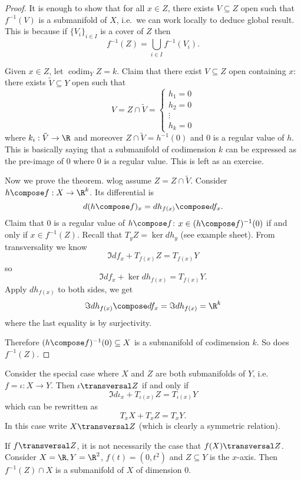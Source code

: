 \documentclass[a4paper]{article}
\DeclareMathOperator{\codim}{codim}
\begin{document}
\begin{proof}
  It is enough to show that for all \(x \in Z\), there exists \(V \subseteq Z\) open such that \(f^{-1}(V)\) is a submanifold of \(X\), i.e.\ we can work locally to deduce global result. This is because if \(\{V_i\}_{i \in I}\) is a cover of \(Z\) then
  \[
    f^{-1}(Z) = \bigcup_{i \in I} f^{-1}(V_i).
  \]

  Given \(x \in Z\), let \(\codim_Y Z = k\). Claim that there exist \(V \subseteq Z\) open containing \(x\): there exists \(\tilde V \subseteq Y\) open such that
  \[
    V = Z \cap \tilde V =
    \begin{cases}
      h_1 = 0 \\
      h_2 = 0 \\
      \vdots \\
      h_k = 0
    \end{cases}
  \]
  where \(k_i: \tilde V \to \R\) and moreover \(Z \cap \tilde V = h^{-1}(0)\) and \(0\) is a regular value of \(h\). This is basically saying that a submanifold of codimension \(k\) can be expressed as the pre-image of \(0\) where \(0\) is a regular value. This is left as an exercise.

  Now we prove the theorem. wlog assume \(Z = Z \cap \tilde V\). Consider \(h \compose f: X \to \R^k\). Its differential is
  \[
    d(h \compose f)_x = dh_{f(x)} \compose df_x.
  \]
  Claim that \(0\) is a regular value of \(h \compose f\): \(x \in (h \compose f)^{-1}(0)\) if and only if \(x \in f^{-1}(Z)\). Recall that \(T_yZ = \ker dh_y\) (see example sheet). From transversality we know
  \[
    \Im df_x + T_{f(x)}Z = T_{f(x)}Y
  \]
  so
  \[
    \Im df_x + \ker dh_{f(x)} = T_{f(x)}Y.
  \]
  Apply \(dh_{f(x)}\) to both sides, we get
  \[
    \Im dh_{f(x)} \compose df_x = \Im dh_{f(x)} = \R^k
  \]
  where the last equality is by surjectivity.

  Therefore \((h \compose f)^{-1}(0) \subseteq X\) is a submanifold of codimension \(k\). So does \(f^{-1}(Z)\).
\end{proof}

Consider the special case where \(X\) and \(Z\) are both submanifolds of \(Y\), i.e.\ \(f = \iota: X \to Y\). Then \(\iota \transversal Z\) if and only if
\[
  \Im d\iota_x + T_{\iota(x)}Z = T_{\iota(x)}Y
\]
which can be rewritten as
\[
  T_xX + T_xZ = T_xY.
\]
In this case write \(X \transversal Z\) (which is clearly a symmetric relation).

\begin{eg}
  If \(f \transversal Z\), it is not necessarily the case that \(f(X) \transversal Z\). Consider \(X = \R, Y = \R^2\), \(f(t) = (0, t^2)\) and \(Z \subseteq Y\) is the \(x\)-axis. Then \(f^{-1}(Z) \cap X\) is a submanifold of \(X\) of dimension \(0\).
\end{eg}
\end{document}
